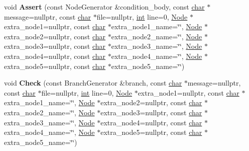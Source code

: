 \begin{DoxyCompactItemize}
\item 
\mbox{\label{classv8_1_1internal_1_1CodeStubAssembler_a9d8ba2b6b7648743654a643124bc2d76}} 
void {\bfseries Assert} (const Node\+Generator \&condition\+\_\+body, const \mbox{\hyperlink{classchar}{char}} $\ast$message=nullptr, const \mbox{\hyperlink{classchar}{char}} $\ast$file=nullptr, \mbox{\hyperlink{classint}{int}} line=0, \mbox{\hyperlink{classv8_1_1internal_1_1compiler_1_1Node}{Node}} $\ast$extra\+\_\+node1=nullptr, const \mbox{\hyperlink{classchar}{char}} $\ast$extra\+\_\+node1\+\_\+name=\char`\"{}\char`\"{}, \mbox{\hyperlink{classv8_1_1internal_1_1compiler_1_1Node}{Node}} $\ast$extra\+\_\+node2=nullptr, const \mbox{\hyperlink{classchar}{char}} $\ast$extra\+\_\+node2\+\_\+name=\char`\"{}\char`\"{}, \mbox{\hyperlink{classv8_1_1internal_1_1compiler_1_1Node}{Node}} $\ast$extra\+\_\+node3=nullptr, const \mbox{\hyperlink{classchar}{char}} $\ast$extra\+\_\+node3\+\_\+name=\char`\"{}\char`\"{}, \mbox{\hyperlink{classv8_1_1internal_1_1compiler_1_1Node}{Node}} $\ast$extra\+\_\+node4=nullptr, const \mbox{\hyperlink{classchar}{char}} $\ast$extra\+\_\+node4\+\_\+name=\char`\"{}\char`\"{}, \mbox{\hyperlink{classv8_1_1internal_1_1compiler_1_1Node}{Node}} $\ast$extra\+\_\+node5=nullptr, const \mbox{\hyperlink{classchar}{char}} $\ast$extra\+\_\+node5\+\_\+name=\char`\"{}\char`\"{})
\item 
\mbox{\label{classv8_1_1internal_1_1CodeStubAssembler_a22e83a6b6f9fe28411b177c26d8798bb}} 
void {\bfseries Check} (const Branch\+Generator \&branch, const \mbox{\hyperlink{classchar}{char}} $\ast$message=nullptr, const \mbox{\hyperlink{classchar}{char}} $\ast$file=nullptr, \mbox{\hyperlink{classint}{int}} line=0, \mbox{\hyperlink{classv8_1_1internal_1_1compiler_1_1Node}{Node}} $\ast$extra\+\_\+node1=nullptr, const \mbox{\hyperlink{classchar}{char}} $\ast$extra\+\_\+node1\+\_\+name=\char`\"{}\char`\"{}, \mbox{\hyperlink{classv8_1_1internal_1_1compiler_1_1Node}{Node}} $\ast$extra\+\_\+node2=nullptr, const \mbox{\hyperlink{classchar}{char}} $\ast$extra\+\_\+node2\+\_\+name=\char`\"{}\char`\"{}, \mbox{\hyperlink{classv8_1_1internal_1_1compiler_1_1Node}{Node}} $\ast$extra\+\_\+node3=nullptr, const \mbox{\hyperlink{classchar}{char}} $\ast$extra\+\_\+node3\+\_\+name=\char`\"{}\char`\"{}, \mbox{\hyperlink{classv8_1_1internal_1_1compiler_1_1Node}{Node}} $\ast$extra\+\_\+node4=nullptr, const \mbox{\hyperlink{classchar}{char}} $\ast$extra\+\_\+node4\+\_\+name=\char`\"{}\char`\"{}, \mbox{\hyperlink{classv8_1_1internal_1_1compiler_1_1Node}{Node}} $\ast$extra\+\_\+node5=nullptr, const \mbox{\hyperlink{classchar}{char}} $\ast$extra\+\_\+node5\+\_\+name=\char`\"{}\char`\"{})

\end{DoxyCompactItemize}
